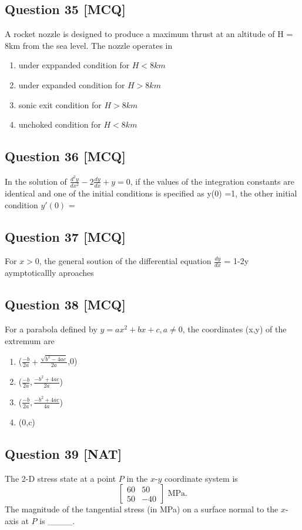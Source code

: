 \documentclass[12pt,a4paper]{article}
\begin{document}
\subsection*{Question 35 [MCQ]}
A rocket nozzle is designed to produce a maximum thrust at an altitude of H = 8km from the sea level. The nozzle operates in 
\begin{enumerate}[label=(\alph*)]
\item  under exppanded condition for $H < 8km$
\item  under expanded condition for $H > 8km$
\item  sonic exit condition for $H > 8km$
\item  unchoked condition for $H < 8km$
\end{enumerate}


\subsection*{Question 36 [MCQ]}
In the solution of $\frac{d^2y}{dx^2}-2\frac{dy}{dx}+y=0$, if the values of the integration constants are identical and one of the initial conditions is specified as y(0) =1, the other initial condition $y′(0)$ = 

\subsection*{Question 37 [MCQ]}
For $x>0$, the general soution of the differential equation $\frac{dy}{dx}$ = 1-2y aymptoticallly aproaches


\subsection*{Question 38 [MCQ]}
For a parabola defined by $y= ax^2+ bx+ c, a\neq 0 $, the coordinates (x,y) of the extremum are 
\begin{enumerate}[label=(\alph*)]
\item  ($\frac{-b}{2a} + \frac{\sqrt{b^2-4ac}}{2a}$,0)
\item  ($\frac{-b}{2a} , \frac{-b^2+4ac}{2a}$)
\item  ($\frac{-b}{2a} , \frac{-b^2+4ac}{4a}$)
\item  (0,c)
\end{enumerate}








\subsection*{Question 39 [NAT]}
The 2-D stress state at a point \( P \) in the \( x\text{-}y \) coordinate system is  
\[
\begin{bmatrix}
60 & 50 \\
50 & -40
\end{bmatrix} \text{ MPa}.
\]  
The magnitude of the tangential stress (in MPa) on a surface normal to the \( x \)-axis at \( P \) is \_\_\_\_.
\end{document}
